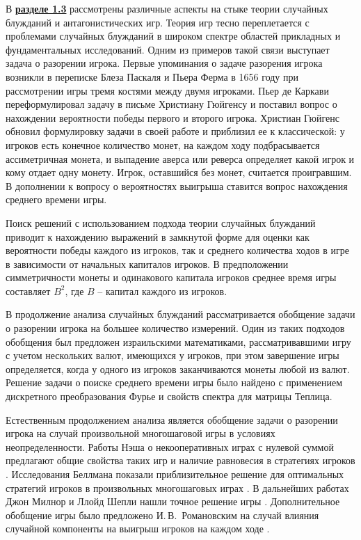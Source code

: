 В \underline{\textbf{разделе 1.3}} рассмотрены различные аспекты на стыке теории случайных блужданий и антагонистических игр. Теория игр тесно переплетается с проблемами случайных блужданий в широком спектре областей прикладных и фундаментальных исследований. Одним из примеров такой связи выступает задача о разорении игрока. Первые упоминания о задаче разорения игрока возникли в переписке Блеза Паскаля и Пьера Ферма в 1656 году при рассмотрении игры тремя костями между двумя игроками. Пьер де Каркави переформулировал задачу в письме Христиану Гюйгенсу и поставил вопрос о нахождении вероятности победы первого и второго игрока. Христиан Гюйгенс обновил формулировку задачи в своей работе и приблизил ее к классической: у игроков есть конечное количество монет, на каждом ходу подбрасывается ассиметричная монета, и выпадение аверса или реверса определяет какой игрок и кому отдает одну монету. Игрок, оставшийся без монет, считается проигравшим. В дополнении к вопросу о вероятностях выигрыша ставится вопрос нахождения среднего времени игры.

Поиск решений с использованием подхода теории случайных блужданий приводит к нахождению выражений в замкнутой форме для оценки как вероятности победы каждого из игроков, так и среднего количества ходов в игре в зависимости от начальных капиталов игроков. В предположении симметричности монеты и одинакового капитала игроков среднее время игры составляет $B^2$, где $B$ -- капитал каждого из игроков.

В продолжение анализа случайных блужданий рассматривается обобщение задачи о разорении игрока на большее количество измерений. Один из таких подходов обобщения был предложен израильскими математиками, рассматривавшими игру с учетом нескольких валют, имеющихся у игроков, при этом завершение игры определяется, когда у одного из игроков заканчиваются монеты любой из валют. Решение задачи о поиске среднего времени игры было найдено с применением дискретного преобразования Фурье и свойств спектра для матрицы Теплица. 

Естественным продолжением анализа является обобщение задачи о разорении игрока на случай произвольной многошаговой игры в условиях неопределенности. Работы Нэша о некооперативных играх с нулевой суммой предлагают общие свойства таких игр и наличие равновесия в стратегиях игроков \cite{nash_non-cooperative_1951}. Исследования Беллмана показали приблизительное решение для оптимальных стратегий игроков в произвольных многошаговых играх \cite{bellman_decision-making_1954}. В дальнейших работах Джон Милнор и Ллойд Шепли нашли точное решение игры \cite{milnor_games_1956}. Дополнительное обобщение игры было предложено И.\,В.~Романовским на случай влияния случайной компоненты на выигрыш игроков на каждом ходе \cite{romanovsky_1961}. 

